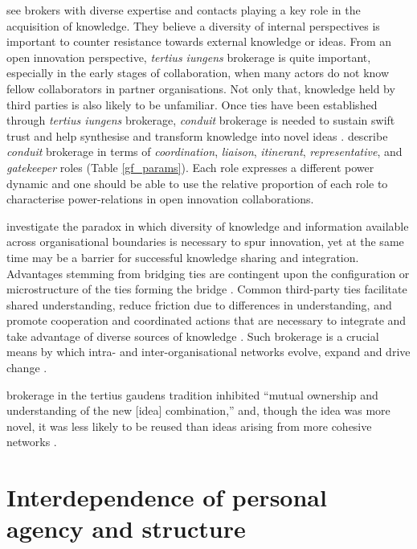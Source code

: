 \citet{cohen1990absorptive} see brokers with diverse expertise and contacts playing a key role in the acquisition of knowledge. They believe a diversity of internal perspectives is important to counter resistance towards external knowledge or ideas. From an open innovation perspective, \emph{tertius iungens} brokerage is quite important, especially in the early stages of collaboration, when many actors do not know fellow collaborators in partner organisations. Not only that, knowledge held by third parties is also likely to be unfamiliar. Once ties have been established through \emph{tertius iungens} brokerage, \emph{conduit} brokerage is needed to sustain swift trust and help synthesise and transform knowledge into novel ideas \citep{fleming2007collaborative,lingo2010nexus,quintane2016brokers}. \citet{gould1989structures} describe \emph{conduit} brokerage in terms of \emph{coordination}, \emph{liaison}, \emph{itinerant}, \emph{representative}, and \emph{gatekeeper} roles (Table \ref{gf_params}). Each role expresses a different power dynamic and one should be able to use the relative proportion of each role to characterise power-relations in open innovation collaborations. \medskip

\citet{tortoriello2010activating} investigate the paradox in which diversity of knowledge and information available across organisational boundaries is necessary to spur innovation, yet at the same time may be a barrier for successful knowledge sharing and integration. Advantages stemming from bridging ties are contingent upon the configuration or microstructure of the ties forming the bridge \citep{tortoriello2010activating,tortoriello2015social}. Common third-party ties facilitate shared understanding, reduce friction due to differences in understanding, and promote cooperation and coordinated actions that are necessary to integrate and take advantage of diverse sources of knowledge \citep{tortoriello2010activating}. Such brokerage is a crucial means by which intra- and inter-organisational networks evolve, expand and drive change \citep{obstfeld2014brokerage}.  \medskip

brokerage in the  tertius gaudens  tradition inhibited “mutual ownership and understanding of the new [idea] combination,” and, though the idea was more novel, it was less likely to be reused than ideas arising from more cohesive networks \citep{marabelli2016}.

\section{Interdependence of personal agency and structure}

